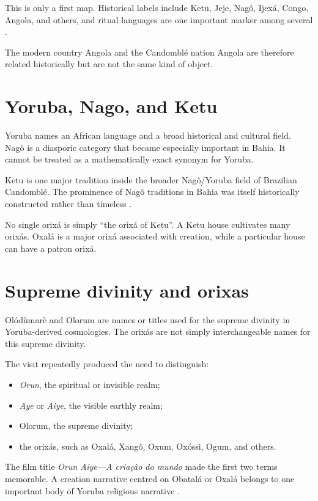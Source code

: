 This is only a first map.  Historical
labels include Ketu, Jeje, Nag\^o, Ijex\'a,
Congo, Angola, and others, and ritual
languages are one important marker among
several \cite{castro1981lingua}.

The modern country Angola and the
Candombl\'e nation Angola are therefore
related historically but are not the same
kind of object.

\section{Yoruba, Nago, and Ketu}
\label{section-yoruba-nago-ketu}

Yoruba names an African language and a
broad historical and cultural field.
Nag\^o is a diasporic category that became
especially important in Bahia.  It cannot
be treated as a mathematically exact
synonym for Yoruba.

Ketu is one major tradition inside the
broader Nag\^o/Yoruba field of Brazilian
Candombl\'e.  The prominence of Nag\^o
traditions in Bahia was itself historically
constructed rather than timeless
\cite{pares2010nago}.

No single orix\'a is simply ``the orix\'a
of Ketu''.  A Ketu house cultivates many
orix\'as.  Oxal\'a is a major orix\'a
associated with creation, while a
particular house can have a patron orix\'a.

\section{Supreme divinity and orixas}
\label{section-supreme-divinity-orixas}

Ol\'od\`umar\`e and Olorum are names or
titles used for the supreme divinity in
Yoruba-derived cosmologies.  The orix\'as
are not simply interchangeable names for
this supreme divinity.

The visit repeatedly produced the need to
distinguish:

\begin{itemize}
\item \emph{Orun}, the spiritual or
invisible realm;
\item \emph{Aye} or \emph{Aiye}, the
visible earthly realm;
\item Olorum, the supreme divinity;
\item the orix\'as, such as Oxal\'a,
Xang\^o, Oxum, Ox\'ossi, Ogum, and others.
\end{itemize}

The film title
\emph{Orun Aiye---A cria\c{c}\~ao do mundo}
made the first two terms memorable.  A
creation narrative centred on Obatal\'a or
Oxal\'a belongs to one important body of
Yoruba religious narrative
\cite{marins2012obatala}.

